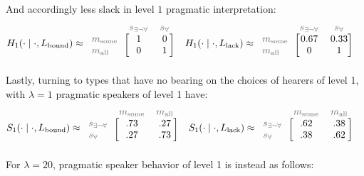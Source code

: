 \documentclass[a4paper, 11pt]{article}
\theoremstyle{Satz}
\newcommand{\state}{\ensuremath{s}\xspace}		%
\newcommand{\mystate}[1]{\ensuremath{\state_{\text{#1}}}\xspace} %
\newcommand{\mylang}[1]{\ensuremath{L_{\text{#1}}}\xspace} %
\newcommand{\messg}{\ensuremath{m}\xspace}		%
\newcommand{\mymessg}[1]{\ensuremath{\messg_{\text{#1}}}\xspace} %
\newcommand{\ssome}{\mystate{\ensuremath{\exists\neg\forall}}}
\newcommand{\sall}{\mystate{\ensuremath{\forall}}}
\newcommand{\msome}{\mymessg{some}}
\newcommand{\mall}{\mymessg{all}}
\newcommand{\Lbound}{\mylang{bound}}
\newcommand{\Llack}{\mylang{lack}}
\newcommand{\mygray}[1]{{\textcolor{mygray}{#1}}}
\begin{document}
And accordingly less slack in level $1$ pragmatic interpretation:
\begin{align*}
  H_1(\cdot \mid \cdot, \Lbound) & \approx \begin{blockarray}{lcc}
    & \mygray{\ssome} & \mygray{\sall} \\
    \begin{block}{l[cc]}
      \mygray{\msome} & 1 & 0 \\
      \mygray{\mall}  & 0 & 1 \\
    \end{block}
  \end{blockarray} &
  H_1(\cdot \mid \cdot, \Llack) & \approx \begin{blockarray}{lcc}
    & \mygray{\ssome} & \mygray{\sall} \\
    \begin{block}{l[cc]}
      \mygray{\msome} & 0.67 & 0.33 \\
      \mygray{\mall}  & 0 & 1 \\
    \end{block}
  \end{blockarray} 
\end{align*}
Lastly, turning to types that have no bearing on the choices of hearers of level 1, with $\lambda = 1$ pragmatic speakers of level 1 have:
\begin{align*}
  S_1(\cdot \mid \cdot, \Lbound) & \approx \begin{blockarray}{lcc}
    & \mygray{\msome} & \mygray{\mall} \\
    \begin{block}{l[cc]}
      \mygray{\ssome} & .73 & .27 \\
      \mygray{\sall}  & .27 & .73 \\
    \end{block}
  \end{blockarray} &
  S_1(\cdot \mid \cdot, \Llack) & \approx \begin{blockarray}{lcc}
    & \mygray{\msome} & \mygray{\mall} \\
    \begin{block}{l[cc]}
      \mygray{\ssome} & .62 & .38 \\
      \mygray{\sall}  & .38 & .62 \\
    \end{block}
  \end{blockarray} 
\end{align*}
For $\lambda = 20$, pragmatic speaker behavior of level 1 is instead as follows:
\end{document}
